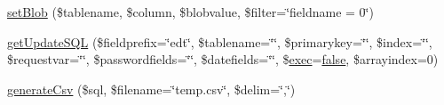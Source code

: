 \begin{DoxyCompactItemize}
\hyperlink{classDebby_a6a77444ee8c09f53fa741ae96b33e55c}{set\+Blob} (\$tablename, \$column, \$blobvalue, \$filter=\char`\"{}fieldname = 0\char`\"{})
\item 
\hyperlink{classDebby_a3361696a807a1f5a968db4cb6643c8d6}{get\+Update\+S\+Q\+L} (\$fieldprefix=\char`\"{}edt\char`\"{}, \$tablename=\char`\"{}\char`\"{}, \$primarykey=\char`\"{}\char`\"{}, \$index=\char`\"{}\char`\"{}, \$requestvar=\char`\"{}\char`\"{}, \$passwordfields=\char`\"{}\char`\"{}, \$datefields=\char`\"{}\char`\"{}, \$\hyperlink{classDebby_a246a7d5268c855f26ce31f4088ce56e9}{exec}=\hyperlink{tina4_8php_aec2deb5590a84bee262c3bea206ae88f}{false}, \$arrayindex=0)
\item 
\hyperlink{classDebby_ac947c9394a4bfeda1f81902ffd03aa4c}{generate\+Csv} (\$sql, \$filename=\char`\"{}temp.\+csv\char`\"{}, \$delim=\char`\"{},\char`\"{})
\end{DoxyCompactItemize}
